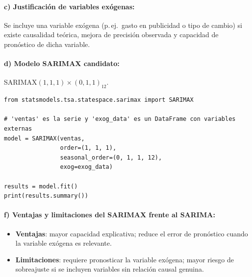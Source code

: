 \documentclass[12pt, a4paper]{article}
\begin{document}
\paragraph{c) Justificación de variables exógenas:}
Se incluye una variable exógena (p.\,ej.\ gasto en publicidad o tipo de cambio)
si existe causalidad teórica, mejora de precisión observada y capacidad de
pronóstico de dicha variable.

\paragraph{d) Modelo SARIMAX candidato:}
SARIMAX$(1,1,1)\times(0,1,1)_{12}$.

\begin{lstlisting}
from statsmodels.tsa.statespace.sarimax import SARIMAX

# 'ventas' es la serie y 'exog_data' es un DataFrame con variables externas
model = SARIMAX(ventas,
                order=(1, 1, 1),
                seasonal_order=(0, 1, 1, 12),
                exog=exog_data)

results = model.fit()
print(results.summary())
\end{lstlisting}

\paragraph{f) Ventajas y limitaciones del SARIMAX frente al SARIMA:}
\begin{itemize}
  \item \textbf{Ventajas}: mayor capacidad explicativa; reduce el error de
        pronóstico cuando la variable exógena es relevante.
  \item \textbf{Limitaciones}: requiere pronosticar la variable exógena; mayor
        riesgo de sobreajuste si se incluyen variables sin relación causal genuina.
\end{itemize}
\end{document}
